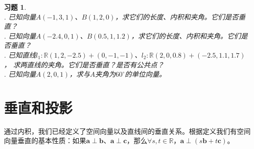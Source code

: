 \documentclass[12pt,UTF8]{ctexbook}
\newtheorem{xt}{习题}[section]
\begin{document}
\begin{xt}
    \mbox{} \\
    . 已知向量$A(-1, 3, 1)$、$B(1, 2, 0)$，求它们的长度、内积和夹角。它们是否垂直？\\
    . 已知向量$A(-2.4, 0, 1)$、$B(0.5, 1, 1.2)$，求它们的长度、内积和夹角。它们是否垂直？\\
    . 已知直线$l_1: \mathbb{R}(1,2,-2.5) + (0,-1,-1)$、$l_2: \mathbb{R}(2,0,0.8) + (-2.5,1.1,1.7)$，
    求两直线的夹角。它们是否垂直？是否有公共点？\\
    . 已知向量$A(2, 0, 1)$，求与$A$夹角为$60^\circ$的单位向量。
\end{xt}

\section{垂直和投影}

通过内积，我们已经定义了空间向量以及直线间的垂直关系。根据定义我们有空间向量垂直的基本性质：如果$\mathbf{a}\perp \mathbf{b}$、$\mathbf{a}\perp \mathbf{c}$，那么$\forall s, t\in\mathbb{R}$，$\mathbf{a}\perp (s\mathbf{b} + t\mathbf{c})$。
\end{document}
